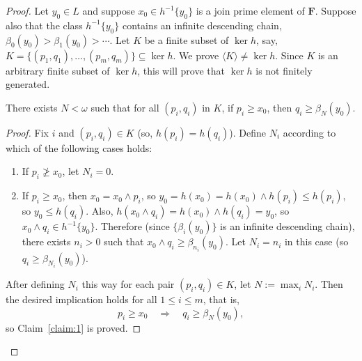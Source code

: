 \begin{proof} Let $y_0\in L$ and suppose 
  $x_0 \in h^{-1}\{y_0\}$ is a join prime element of $\mathbf F$. 
  Suppose also that the class $h^{-1}\{y_0\}$ contains an 
  infinite descending chain, $\beta_0(y_0) > \beta_1(y_0) > \cdots$.
  Let $K$ be a finite subset of $\ker h$, say, 
  $K = \{(p_1, q_1), \dots, (p_{m}, q_{m})\} \subseteq \ker h$.
  We prove $\langle K \rangle \neq \ker h$. 
  Since $K$ is an arbitrary finite subset of $\ker h$, this will prove 
  that $\ker h$ is not finitely generated.

\begin{claim}
  \label{claim:1}
There exists $N<\omega$ such that for all $(p_i, q_i)$ in $K$, if $p_i \geqslant x_0$, then $q_i \geqslant \beta_N (y_0)$.
\end{claim}
\begin{proof}
Fix $i$ and $(p_i, q_i) \in K$ (so, $h(p_i) = h(q_i)$). Define $N_i$ according 
to which of the following cases holds:
\begin{enumerate}
\item If $p_i \ngeqslant x_0$, let $N_i = 0$.  
\item If $p_i\geqslant x_0$, then $x_0 = x_0\wedge p_i$, so 
$y_0 = h(x_0) = h(x_0) \wedge h(p_i) \leqslant h(p_i)$, so $y_0\leqslant h(q_i)$. 
Also, $h(x_0 \wedge q_i) = h(x_0) \wedge h(q_i) = y_0$, so $x_0\wedge q_i \in h^{-1}\{y_0\}$. 
Therefore (since $\{\beta_i(y_0)\}$ is an infinite descending chain),
there exists $n_i>0$ such that $x_0 \wedge q_i \geqslant\beta_{n_i}(y_0)$. 
Let $N_i = n_i$ in this case (so $q_i \geqslant \beta_{N_i}(y_0)$).
\end{enumerate}
After defining $N_i$ this way for each pair $(p_i,q_i)\in K$, 
let $N := \max_i N_i$. %
Then the desired implication holds for all $1\leqslant i \leqslant m$, that is,
\begin{equation}
\label{eq:star3}    
p_i \geqslant x_0 \quad \Longrightarrow \quad q_i \geqslant \beta_N(y_0),
\end{equation}
so Claim~\ref{claim:1} is proved.
\end{proof}


\end{proof}
